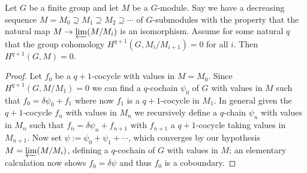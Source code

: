 


\begin{lemma}\label{lem:serre_approx}
	Let $G$ be a finite group and let $M$ be a $G$-module. Say we have
	a decreasing sequence $M=M_0\supseteq M_1\supseteq M_2\supseteq \cdots$
	of $G$-submodules with the property that the natural map $M\to\varprojlim(M/M_i)$
	is an isomorphism.
	Assume for some natural $q$ that the group cohomology $H^{q+1}(G,M_i/M_{i+1})=0$
	for all $i$. Then $H^{q+1}(G,M)=0.$
\end{lemma}
\begin{proof}
	Let $f_0$ be a $q+1$-cocycle with values in $M=M_0$. Since $H^{q+1}(G,M/M_1)=0$ we can
	find a $q$-cochain $\psi_0$ of $G$ with values in $M$ such that $f_0=\delta\psi_0+f_1$
	where now $f_1$ is a $q+1$-cocycle in $M_1$. In general given the $q+1$-cocycle $f_n$ with
	values in $M_n$ we recursively define a $q$-chain $\psi_n$ with values in $M_n$ such
	that $f_n=\delta\psi_n+f_{n+1}$
	with $f_{n+1}$ a $q+1$-cocycle taking values in $M_{n+1}$. Now set $\psi:=\psi_0+\psi_1+\cdots$,
	which converges by our hypothesis $M=\varprojlim(M/M_i)$, defining a $q$-cochain of $G$
	with values in $M$; an elementary calculation now shows $f_0=\delta\psi$ and thus $f_0$ is
	a coboundary.
\end{proof}


